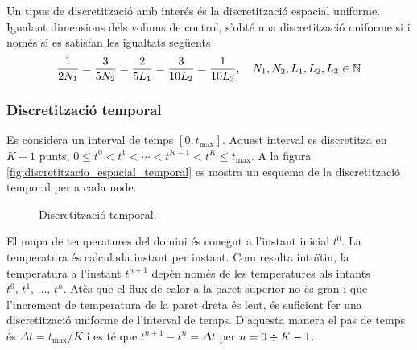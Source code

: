 \noindent
Un tipus de discretització amb interés és la discretització espacial uniforme. Igualant dimensions dels volums de control, s'obté una discretització uniforme si i només si es satisfan les igualtats següents
\begin{equation} \label{eq:malla_uniforme}
	\frac{1}{2 N_1} = 
	\frac{3}{5 N_2} = 
	\frac{2}{5 L_1} = 
	\frac{3}{10 L_2} = 
	\frac{1}{10 L_3},
	\quad
	N_1, N_2, L_1, L_2, L_3 \in \mathbb{N}
\end{equation}


\subsubsection{Discretització temporal}

\noindent
Es considera un interval de temps $[0, t_\text{max}]$. Aquest interval es discretitza en $K+1$ punts, $0 \leq t^0 < t^1 < \cdots < t^{K-1} < t^{K} \leq t_\text{max}$. A la figura \eqref{fig:discretitzacio_espacial_temporal} es mostra un esquema de la discretització temporal per a cada node.


\begin{figure}[h]
	\centering
	\caption{Discretització temporal.}
	\label{fig:discretitzacio_espacial_temporal}
\end{figure}

\noindent
El mapa de temperatures del domini és conegut a l'instant inicial $t^0$. La temperatura és calculada instant per instant. Com resulta intuïtiu, la temperatura a l'instant $t^{n+1}$ depèn només de les temperatures als intants $t^0, \, t^1, \, \ldots, \, t^n$. Atès que el flux de calor a la paret superior no és gran i que l'increment de temperatura de la paret dreta és lent, és suficient fer una discretització uniforme de l'interval de temps. D'aquesta manera el pas de temps és $\Delta t = t_\text{max} / K$ i es té que $t^{n+1} - t^n = \Delta t$ per $n = 0 \divisionsymbol K-1$.

